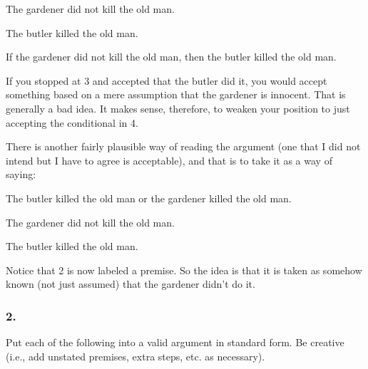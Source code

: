 \begin{enumerate}
{\begin{argument*}
   \aitem The gardener did not kill the old man. 

   \aitem The butler killed the old man. 

   \aitem If the gardener did not kill the old man, then the butler killed the 
   old man. 

  \end{argument*}

If you stopped at 3 and accepted that the butler did it, you would accept 
something based on a mere assumption that the gardener is innocent. That is 
generally a bad idea. It makes sense, therefore, to weaken your position to just 
accepting the conditional in 4.

There is another fairly plausible way of reading the argument (one that I did 
not intend but I have to agree is acceptable), and that is to take it as a way 
of saying:

  \begin{argument*}

   \aitem The butler killed the old man or the gardener killed the old man.  

   \aitem The gardener did not kill the old man. 

   \aitem The butler killed the old man. 


  \end{argument*}

  Notice that 2 is now labeled a premise. So the idea is that it is taken as 
  somehow known (not just assumed) that the gardener didn't do it.

 }

\end{enumerate}

\subsubsection*{2.}

Put each of the following into a valid argument in standard form. Be creative 
(i.e., add unstated premises, extra steps, etc. as necessary).

